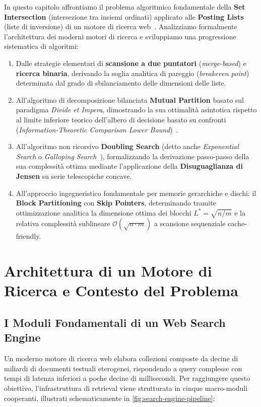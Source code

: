 In questo capitolo affrontiamo il problema algoritmico fondamentale della \textbf{Set Intersection} (intersezione tra insiemi ordinati) applicato alle \textbf{Posting Lists} (liste di inversione) di un motore di ricerca web~\cite{manning2008,moffat1996}. Analizziamo formalmente l'architettura dei moderni motori di ricerca e sviluppiamo una progressione sistematica di algoritmi:
\begin{enumerate}
  \item Dalle strategie elementari di \textbf{scansione a due puntatori} (\textit{merge-based}) e \textbf{ricerca binaria}, derivando la soglia analitica di pareggio (\textit{breakeven point}) determinata dal grado di sbilanciamento delle dimensioni delle liste.
  \item All'algoritmo di decomposizione bilanciata \textbf{Mutual Partition} basato sul paradigma \textit{Divide et Impera}, dimostrando la sua ottimalità asintotica rispetto al limite inferiore teorico dell'albero di decisione basato su confronti (\textit{Information-Theoretic Comparison Lower Bound})~\cite{baezayates2004,demaine2000}.
  \item All'algoritmo non ricorsivo \textbf{Doubling Search} (detto anche \textit{Exponential Search} o \textit{Galloping Search}~\cite{bentley1976}), formalizzando la derivazione passo-passo della sua complessità ottima mediante l'applicazione della \textbf{Disuguaglianza di Jensen} su serie telescopiche concave.
  \item All'approccio ingegneristico fondamentale per memorie gerarchiche e dischi: il \textbf{Block Partitioning} con \textbf{Skip Pointers}, determinando tramite ottimizzazione analitica la dimensione ottima dei blocchi $L^* = \sqrt{n/m}$ e la relativa complessità sublineare $\mathcal{O}(\sqrt{n \cdot m})$ a scansione sequenziale cache-friendly.
\end{enumerate}

\FloatBarrier
\section{Architettura di un Motore di Ricerca e Contesto del Problema}
\label{sec:search-engine-architecture}

\subsection{I Moduli Fondamentali di un Web Search Engine}
Un moderno motore di ricerca web elabora collezioni composte da decine di miliardi di documenti testuali eterogenei, rispondendo a query complesse con tempi di latenza inferiori a poche decine di millisecondi. Per raggiungere questo obiettivo, l'infrastruttura di retrieval viene strutturata in cinque macro-moduli cooperanti, illustrati schematicamente in \autoref{fig:search-engine-pipeline}:


